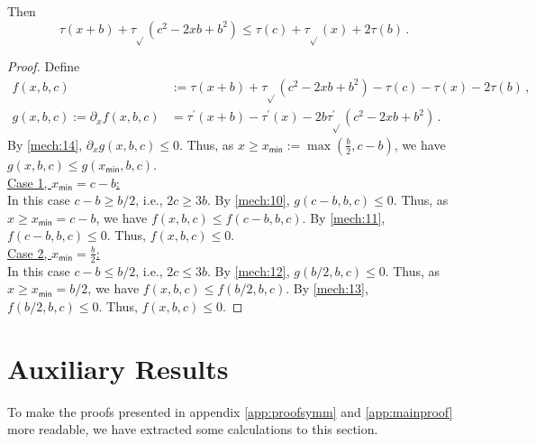 \documentclass{article}
\newcommand*{\ms}[1]{\mathsf{#1}}
\newcommand{\pr}{^\prime}
\newcommand{\equationFullstop}{\, .}
\newcommand{\eqfs}{\equationFullstop}
\newcommand{\equationComma}{\, ,}
\newcommand{\eqcm}{\equationComma}
\newcommand{\tran}{\tau}
\newcommand{\trans}{\tran_{\!\sqrt{}}}
\newcommand{\dtrans}{\trans\pr}
\newcommand{\dtran}{\tran\pr}
\begin{document}
\begin{appendix}
\begin{lemma}
	Then
	\begin{equation*}
		\tran(x+b) + \trans(c^2 - 2 x b + b^2) \leq \tran(c) + \trans(x) + 2 \tran(b) 
		\eqfs
	\end{equation*}	
\end{lemma}
%
\begin{proof}
	Define
	\begin{align*}
		f(x,b,c) &:= \tran(x+b) + \trans(c^2 - 2 x b + b^2) - \tran(c) - \tran(x) - 2 \tran(b) \eqcm
		\\
		g(x,b,c) := \partial_x f(x,b,c)
		&=
		\dtran(x+b) - \dtran(x) - 2b\dtrans(c^2 - 2 x b + b^2)
		\eqfs
	\end{align*}
	By \cref{mech:14}, $\partial_x g(x,b,c) \leq 0$. 
	Thus, as $x \geq x_{\ms{min}} := \max(\frac b2, c-b)$, we have $g(x,b,c) \leq g(x_{\ms{min}},b,c)$. 
	\\
	\underline{Case 1, $x_{\ms{min}} = c-b$:}\\
	In this case $c-b \geq b/2$, i.e., $2c\geq3b$. By \cref{mech:10}, $g(c-b, b, c) \leq 0$. 
	Thus, as $x\geq x_{\ms{min}} = c-b$, we have $f(x,b,c) \leq f(c-b, b, c)$. By \cref{mech:11}, $f(c-b, b, c) \leq 0$.
	Thus, $f(x,b,c) \leq 0$.
	\\
	\underline{Case 2, $x_{\ms{min}} = \frac b2$:}\\
	In this case $c-b\leq b/2$, i.e., $2c \leq 3b$. By \cref{mech:12}, $g(b/2, b, c) \leq 0$. 
	Thus, as $x\geq x_{\ms{min}} = b/2$, we have $f(x,b,c) \leq f(b/2, b, c)$. By \cref{mech:13}, $f(b/2, b, c) \leq 0$.
	Thus, $f(x,b,c) \leq 0$.
\end{proof}
%
%
%
\section{Auxiliary Results}\label{app:aux}
To make the proofs presented in appendix \ref{app:proofsymm} and \ref{app:mainproof} more readable, we have extracted some calculations to this section.
%
%
%
%

\end{appendix}
\end{document}
